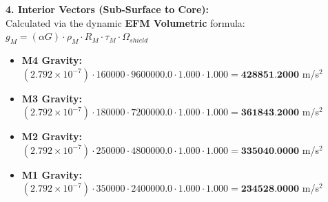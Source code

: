 \documentclass[11pt, a4paper]{article}
\begin{document}
  \vspace{0.5em}
  \noindent \textbf{4. Interior Vectors (Sub-Surface to Core):} \\[0.5em]
  \hspace*{1em} Calculated via the dynamic \textbf{EFM Volumetric} formula: $g_M = (\alpha G) \cdot \rho_{M} \cdot R_M \cdot \tau_M \cdot \Omega_{shield}$
  \begin{itemize}
    \item \textbf{M4 Gravity:} $(2.792 \times 10^{-7}) \cdot 160000 \cdot 9600000.0 \cdot 1.000 \cdot 1.000 = \textbf{428851.2000}$ m/s$^2$
    \item \textbf{M3 Gravity:} $(2.792 \times 10^{-7}) \cdot 180000 \cdot 7200000.0 \cdot 1.000 \cdot 1.000 = \textbf{361843.2000}$ m/s$^2$
    \item \textbf{M2 Gravity:} $(2.792 \times 10^{-7}) \cdot 250000 \cdot 4800000.0 \cdot 1.000 \cdot 1.000 = \textbf{335040.0000}$ m/s$^2$
    \item \textbf{M1 Gravity:} $(2.792 \times 10^{-7}) \cdot 350000 \cdot 2400000.0 \cdot 1.000 \cdot 1.000 = \textbf{234528.0000}$ m/s$^2$
  \end{itemize}
\end{document}
